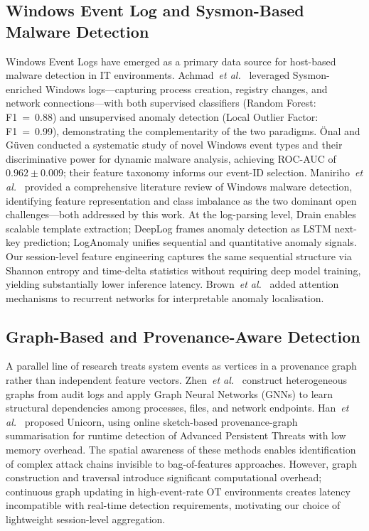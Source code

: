 \label{sec:related}

\subsection{Windows Event Log and Sysmon-Based Malware Detection}

Windows Event Logs have emerged as a primary data source for host-based malware detection
in IT environments. Achmad~\textit{et al.}\ \cite{achmad2025} leveraged Sysmon-enriched
Windows logs—capturing process creation, registry changes, and network connections—with
both supervised classifiers (Random Forest: F1~=~0.88) and unsupervised anomaly detection
(Local Outlier Factor: F1~=~0.99), demonstrating the complementarity of the two paradigms.
\"{O}nal and G\"{u}ven \cite{onal2025} conducted a systematic study of novel Windows
event types and their discriminative power for dynamic malware analysis, achieving
ROC-AUC of $0.962 \pm 0.009$; their feature taxonomy informs our event-ID selection.
Maniriho~\textit{et al.}\ \cite{maniriho2024} provided a comprehensive literature review
of Windows malware detection, identifying feature representation and class imbalance as
the two dominant open challenges—both addressed by this work. At the log-parsing level,
Drain \cite{he2017drain} enables scalable template extraction; DeepLog \cite{du2017deeplog}
frames anomaly detection as LSTM next-key prediction; LogAnomaly \cite{zhao2019loganomaly}
unifies sequential and quantitative anomaly signals. Our session-level feature engineering
captures the same sequential structure via Shannon entropy and time-delta statistics
without requiring deep model training, yielding substantially lower inference latency.
Brown~\textit{et al.}\ \cite{brown2018rnn} added attention mechanisms to recurrent networks
for interpretable anomaly localisation.

\subsection{Graph-Based and Provenance-Aware Detection}

A parallel line of research treats system events as vertices in a provenance graph rather
than independent feature vectors. Zhen~\textit{et al.}\ \cite{zhen2025} construct
heterogeneous graphs from audit logs and apply Graph Neural Networks (GNNs) to learn
structural dependencies among processes, files, and network endpoints. Han~\textit{et al.}\
\cite{han2020} proposed Unicorn, using online sketch-based provenance-graph summarisation
for runtime detection of Advanced Persistent Threats with low memory overhead. The spatial
awareness of these methods enables identification of complex attack chains invisible to
bag-of-features approaches. However, graph construction and traversal introduce significant
computational overhead; continuous graph updating in high-event-rate OT environments creates
latency incompatible with real-time detection requirements, motivating our choice of
lightweight session-level aggregation.

